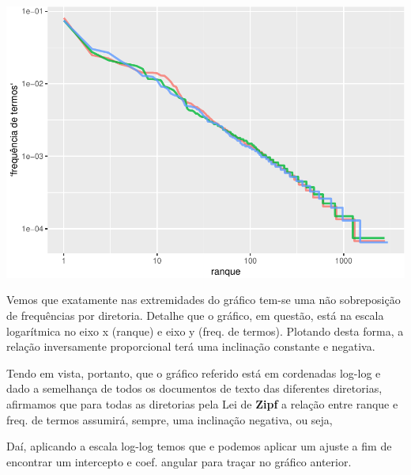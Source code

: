\documentclass[]{article}
\newenvironment{Shaded}{\begin{snugshade}}{\end{snugshade}}
\newcommand{\KeywordTok}[1]{\textcolor[rgb]{0.13,0.29,0.53}{\textbf{#1}}}
\newcommand{\DataTypeTok}[1]{\textcolor[rgb]{0.13,0.29,0.53}{#1}}
\newcommand{\FloatTok}[1]{\textcolor[rgb]{0.00,0.00,0.81}{#1}}
\newcommand{\StringTok}[1]{\textcolor[rgb]{0.31,0.60,0.02}{#1}}
\newcommand{\CommentTok}[1]{\textcolor[rgb]{0.56,0.35,0.01}{\textit{#1}}}
\newcommand{\OtherTok}[1]{\textcolor[rgb]{0.56,0.35,0.01}{#1}}
\newcommand{\OperatorTok}[1]{\textcolor[rgb]{0.81,0.36,0.00}{\textbf{#1}}}
\newcommand{\NormalTok}[1]{#1}
\begin{document}
\begin{Shaded}
\end{Shaded}

\includegraphics{markdown_v40_test_files/figure-latex/unnamed-chunk-29-1.pdf}

Vemos que exatamente nas extremidades do gráfico tem-se uma não
sobreposição de frequências por diretoria. Detalhe que o gráfico, em
questão, está na escala logarítmica no eixo x (ranque) e eixo y (freq.
de termos). Plotando desta forma, a relação inversamente proporcional
terá uma inclinação constante e negativa.

Tendo em vista, portanto, que o gráfico referido está em cordenadas
log-log e dado a semelhança de todos os documentos de texto das
diferentes diretorias, afirmamos que para todas as diretorias pela Lei
de \textbf{Zipf} a relação entre ranque e freq. de termos assumirá,
sempre, uma inclinação negativa, ou seja,

Daí, aplicando a escala log-log temos que e podemos aplicar um ajuste a
fim de encontrar um intercepto e coef. angular para traçar no gráfico
anterior.
\end{document}
